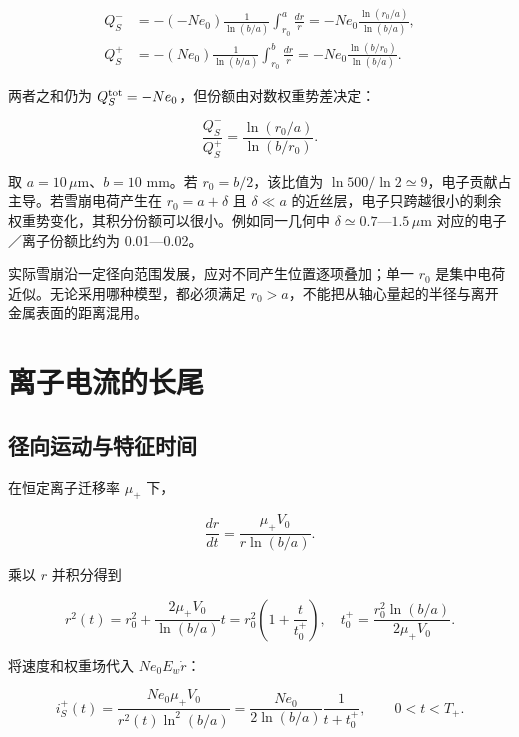 \documentclass[
  11pt,
  a4paper,
  oneside,
  openany]{report}
\numberwithin{equation}{chapter}
\begin{document}
\begin{align}
Q_S^-&=-(-Ne_0)\frac1{\ln(b/a)}\int_{r_0}^{a}\frac{dr}{r}
=-Ne_0\frac{\ln(r_0/a)}{\ln(b/a)},\\
Q_S^+&=-(Ne_0)\frac1{\ln(b/a)}\int_{r_0}^{b}\frac{dr}{r}
=-Ne_0\frac{\ln(b/r_0)}{\ln(b/a)}.
\end{align}

两者之和仍为 \(Q_S^{\rm tot}=-Ne_0\)，但份额由对数权重势差决定：

\begin{equation}
\frac{Q_S^-}{Q_S^+}=\frac{\ln(r_0/a)}{\ln(b/r_0)}.
\end{equation}

取 \(a=10\,\mu\)m、\(b=10\) mm。若 \(r_0=b/2\)，该比值为
\(\ln500/\ln2\simeq9\)，电子贡献占主导。若雪崩电荷产生在
\(r_0=a+\delta\) 且 \(\delta\ll a\)
的近丝层，电子只跨越很小的剩余权重势变化，其积分份额可以很小。例如同一几何中
\(\delta\simeq0.7\)---\(1.5\,\mu\)m 对应的电子／离子份额比约为
0.01---0.02。

实际雪崩沿一定径向范围发展，应对不同产生位置逐项叠加；单一 \(r_0\)
是集中电荷近似。无论采用哪种模型，都必须满足
\(r_0>a\)，不能把从轴心量起的半径与离开金属表面的距离混用。


\section{离子电流的长尾}\label{ux79bbux5b50ux7535ux6d41ux7684ux957fux5c3e}

\subsection{径向运动与特征时间}\label{ux5f84ux5411ux8fd0ux52a8ux4e0eux7279ux5f81ux65f6ux95f4}

在恒定离子迁移率 \(\mu_+\) 下，

\begin{equation}
\frac{dr}{dt}=\frac{\mu_+V_0}{r\ln(b/a)}.
\end{equation}

乘以 \(r\) 并积分得到

\begin{equation}
r^2(t)=r_0^2+\frac{2\mu_+V_0}{\ln(b/a)}t
=r_0^2\left(1+\frac{t}{t_0^+}\right),\quad
t_0^+=\frac{r_0^2\ln(b/a)}{2\mu_+V_0}.
\end{equation}

将速度和权重场代入 \(Ne_0E_w\dot r\)：

\begin{equation}
i_S^+(t)=\frac{Ne_0\mu_+V_0}{r^2(t)\ln^2(b/a)}
=\frac{Ne_0}{2\ln(b/a)}\frac1{t+t_0^+},
\qquad0<t<T_+.
\label{eq:wire-current}
\end{equation}
\end{document}
